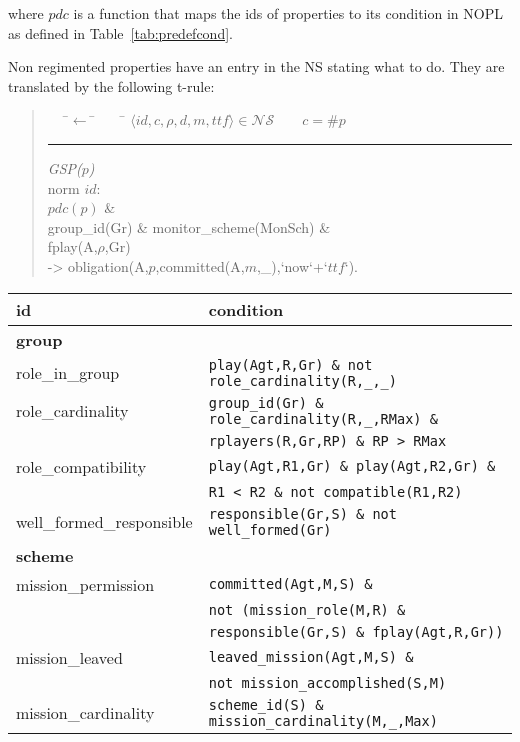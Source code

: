 \documentclass{article}
\newcommand{\set}[1]{\mathcal{#1}}
\newcommand{\andalso}{\quad\quad}
\newcommand{\code}[1]{\texttt{#1}}
\newenvironment{rwrule}[2]
{\begin{quote}\ttfamily\begin{tabbing}~~~\=$\leftarrow$ \= ~~~ \= \kill
     \ensuremath{#2}\\
     \rule[2pt]{6.5cm}{.3pt} \hfill \rwlabel{#1}\\}
{\end{tabbing}\end{quote}}
\newcommand{\rwlabel}[1]{{\scshape\itshape\textrm{#1}}}
\theoremstyle{definition} \newtheorem{definition}{Definition}
\begin{document}
where $pdc$ is a function that maps the ids of properties to its
condition in NOPL as defined in Table~\ref{tab:predefcond}.

Non regimented properties have an entry in the NS stating what to
do. They are translated by the following t-rule:
\begin{rwrule}{GSP($p$)}
  {\langle id, c, \rho, d, m, ttf \rangle \in \set{NS} \andalso c = \#p}
  norm $id$: \\
  \> \> $pdc(p)$ \& \\
  \> \> group\_id(Gr) \& monitor\_scheme(MonSch) \& \\
  \> \> fplay(A,$\rho$,Gr) \\
-> \> obligation(A,$p$,committed(A,$m$,\_),`now`+`$ttf$`).
\end{rwrule}


\begin{table}[t]
  {\small
  \centering
    \begin{tabular}{l l}
      \toprule
      id & condition \\
      \midrule
      \textbf{group}\\
      role\_in\_group      & \code{play(Agt,R,Gr) \& not role\_cardinality(R,\_,\_)}\\
      role\_cardinality      & \code{group\_id(Gr) \& role\_cardinality(R,\_,RMax) \& } \\
                                        & \code{rplayers(R,Gr,RP) \& RP > RMax} \\
      role\_compatibility  & \code{play(Agt,R1,Gr) \& play(Agt,R2,Gr) \&}\\
                                        & \code{R1 < R2 \& not compatible(R1,R2)}\\
      well\_formed\_responsible & \code{responsible(Gr,S) \& not well\_formed(Gr)} \\
      \midrule
      \textbf{scheme}\\
      mission\_permission &  \code{committed(Agt,M,S) \&}\\
                 & \code{not (mission\_role(M,R) \& }\\
                 & \code{responsible(Gr,S) \& fplay(Agt,R,Gr))}\\
     mission\_leaved & \code{leaved\_mission(Agt,M,S) \&}\\
                 & \code{not mission\_accomplished(S,M)}\\
      mission\_cardinality & \code{scheme\_id(S) \& mission\_cardinality(M,\_,Max) }\\

\end{tabular}}
\end{table}
\end{document}
